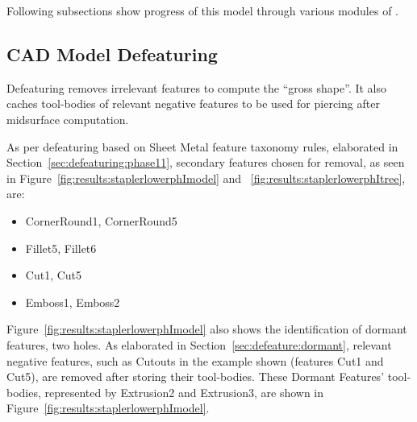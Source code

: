 
%
%
%


Following subsections show progress of this model through various modules of \mysystemname.

\subsection{CAD Model Defeaturing}

Defeaturing removes irrelevant features to compute the ``gross shape''. It also caches tool-bodies of relevant negative features to be used for piercing after midsurface computation. 

As per defeaturing based on Sheet Metal feature taxonomy rules, elaborated in Section~\ref{sec:defeaturing:phase11}, secondary features chosen for removal, as seen in Figure~\ref{fig:results:staplerlowerphImodel} and ~\ref{fig:results:staplerlowerphItree}, are:

\begin{itemize}[noitemsep,topsep=2pt,parsep=2pt,partopsep=2pt]
\item CornerRound1, CornerRound5
\item Fillet5, Fillet6
\item Cut1, Cut5
\item Emboss1, Emboss2
\end{itemize}

Figure~\ref{fig:results:staplerlowerphImodel} also shows the identification of dormant features, two holes. As elaborated in Section~\ref{sec:defeature:dormant}, relevant negative features, such as Cutouts in the example shown (features Cut1 and Cut5), are removed after storing their tool-bodies. These Dormant Features' tool-bodies, represented by Extrusion2 and Extrusion3, are shown in Figure~\ref{fig:results:staplerlowerphImodel}. 


